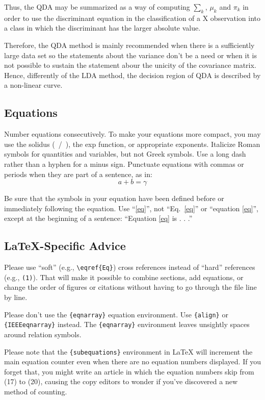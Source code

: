 \documentclass[conference]{IEEEtran}
\begin{document}
Thus, the QDA may be summarized as a way of computing $\sum_k$, $\mu_k$ and $\pi_k$ 
in order to use the discriminant equation in the classification of a X observation into a class
in which the discriminant has the larger absolute value.  

Therefore, the QDA method is mainly recommended when there is a sufficiently large data set
so the statements about the variance don't be a need or when it is not possible to 
sustain the statement abour the unicity of the covariance matrix. Hence, differently 
of the LDA method, the decision region of QDA is described by a non-linear curve. 




\subsection{Equations}
Number equations consecutively. To make your 
equations more compact, you may use the solidus (~/~), the exp function, or 
appropriate exponents. Italicize Roman symbols for quantities and variables, 
but not Greek symbols. Use a long dash rather than a hyphen for a minus 
sign. Punctuate equations with commas or periods when they are part of a 
sentence, as in:
\begin{equation}
a+b=\gamma\label{eq}
\end{equation}

Be sure that the 
symbols in your equation have been defined before or immediately following 
the equation. Use ``\eqref{eq}'', not ``Eq.~\eqref{eq}'' or ``equation \eqref{eq}'', except at 
the beginning of a sentence: ``Equation \eqref{eq} is . . .''

\subsection{\LaTeX-Specific Advice}

Please use ``soft'' (e.g., \verb|\eqref{Eq}|) cross references instead
of ``hard'' references (e.g., \verb|(1)|). That will make it possible
to combine sections, add equations, or change the order of figures or
citations without having to go through the file line by line.

Please don't use the \verb|{eqnarray}| equation environment. Use
\verb|{align}| or \verb|{IEEEeqnarray}| instead. The \verb|{eqnarray}|
environment leaves unsightly spaces around relation symbols.

Please note that the \verb|{subequations}| environment in {\LaTeX}
will increment the main equation counter even when there are no
equation numbers displayed. If you forget that, you might write an
article in which the equation numbers skip from (17) to (20), causing
the copy editors to wonder if you've discovered a new method of
counting.
\end{document}
